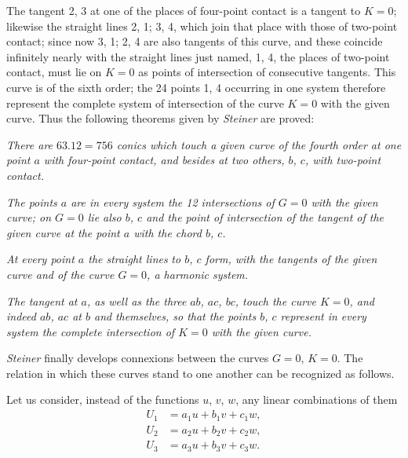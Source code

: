 \documentclass{article}
\begin{document}
The tangent 2, 3 at one of the places of four-point contact is a tangent to $K=0$; likewise the straight lines 2, 1; 3, 4, which join that place with those of two-point contact; since now 3, 1; 2, 4 are also tangents of this curve, and these coincide infinitely nearly with the straight lines just named, 1, 4, the places of two-point contact, must lie on $K=0$ as points of intersection of consecutive tangents. This curve is of the sixth order; the 24 points 1, 4 occurring in one system therefore represent the complete system of intersection of the curve $K=0$ with the given curve. Thus the following theorems given by \emph{Steiner} are proved:

\emph{There are $63.12 = 756$ conics which touch a given curve of the fourth order at one point $a$ with four-point contact, and besides at two others, $b$, $c$, with two-point contact.}

\emph{The points $a$ are in every system the 12 intersections of $G=0$ with the given curve; on $G=0$ lie also $b$, $c$ and the point of intersection of the tangent of the given curve at the point $a$ with the chord $b$, $c$.}

\emph{At every point $a$ the straight lines}  \emph{to $b$, $c$ form, with the tangents of the given curve and of the curve $G=0$, a harmonic system.}

\emph{The tangent at $a$, as well as the three}  \emph{$ab$, $ac$, $bc$, touch the curve $K=0$, and indeed $ab$, $ac$ at $b$ and}  \emph{themselves, so that the points $b$, $c$ represent in every system the complete intersection of $K=0$ with the given curve.}

\emph{Steiner} finally develops connexions between the curves $G=0$, $K=0$. The relation in which these curves stand to one another can be recognized as follows.

Let us consider, instead of the functions $u$, $v$, $w$, any linear combinations of them
\[
\begin{aligned}
U_{1} &= a_{1} u+b_{1} v+c_{1} w,\\
U_{2} &= a_{2} u+b_{2} v+c_{2} w,\\
U_{3} &= a_{3} u+b_{3} v+c_{3} w.
\end{aligned}
\]

\end{document}
